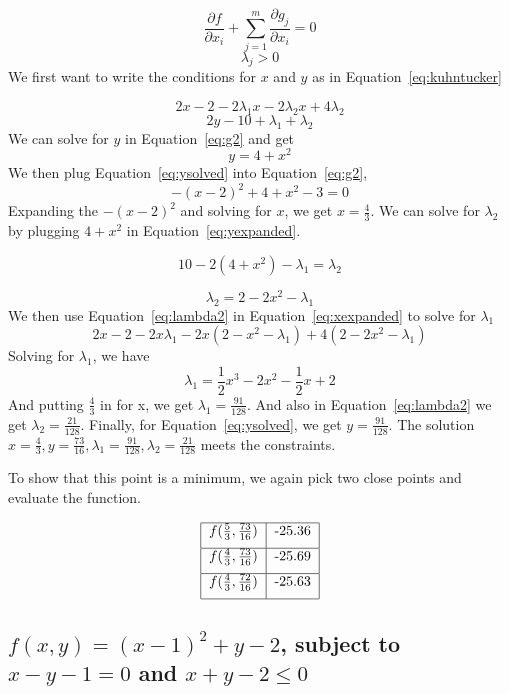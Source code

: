 \documentclass[11pt]{scrartcl}
\begin{document}
\begin{equation}
	\label{eq:kuhntucker}
	\frac{\partial f}{\partial x_i} + \sum_{j=1}^{m}\frac{\partial g_j}{\partial x_i} = 0
\end{equation}
\begin{equation}
	\label{eq:kuhntucker2}
	\lambda_j > 0
\end{equation}
We first want to write the conditions for $x$ and $y$ as in 
Equation~\ref{eq:kuhntucker}

\begin{equation}
	\label{eq:xexpanded}
	2x -2 -2\lambda_1 x - 2\lambda_2 x + 4\lambda_2
\end{equation}
\begin{equation}
	\label{eq:yexpanded}
	2y -10 + \lambda_1 + \lambda_2
\end{equation}
We can solve for $y$ in Equation~\ref{eq:g2}
and get 
\begin{equation}
	\label{eq:ysolved}
	y = 4 + x^2
\end{equation}
We then plug Equation~\ref{eq:ysolved} into Equation~\ref{eq:g2},
\[-(x-2)^2 + 4 + x^2 -3 = 0\]
Expanding the $-(x-2)^2$ and solving for $x$, we get $x=\frac{4}{3}$.
We can solve for $\lambda_2$ by plugging $4+x^2$ in Equation~\ref{eq:yexpanded}.

\[10 - 2(4+x^2) - \lambda_1 = \lambda_2\]

\begin{equation}
	\label{eq:lambda2}
	\lambda_2 = 2 - 2x^2 -\lambda_1
\end{equation}
We then use Equation~\ref{eq:lambda2} in Equation~\ref{eq:xexpanded} to solve
for $\lambda_1$
\[2x - 2 -2x\lambda_1 - 2x(2-x^2-\lambda_1) +4(2-2x^2 -\lambda_1)\]
Solving for $\lambda_1$, we have 
\begin{equation}
	\label{eq:lambda1}
	\lambda_1 = \frac{1}{2}x^3 -2x^2 -\frac{1}{2}x + 2
\end{equation}
And putting $\frac{4}{3}$ in for x, we get $\lambda_1 = \frac{91}{128}$.
And also in Equation~\ref{eq:lambda2} we get $\lambda_2 = \frac{21}{128}$.
Finally, for Equation~\ref{eq:ysolved}, we get $y=\frac{91}{128}$.
The solution $x=\frac{4}{3}, y=\frac{73}{16}, \lambda_1 = \frac{91}{128},
\lambda_2 = \frac{21}{128}$ meets the constraints.

To show that this point is a minimum, we again pick two close points and
evaluate the function.

\[
\begin{tabular}{|c|c|}
	\hline 
	$f(\frac{5}{3}, \frac{73}{16})$ & -25.36 \\ [.2cm]
	\hline 
	$f(\frac{4}{3}, \frac{73}{16})$ & -25.69 \\ [.2cm]
	\hline 
	$f(\frac{4}{3}, \frac{72}{16})$ & -25.63 \\ [.2cm]
	\hline
\end{tabular}
\]

\subsection{$f(x,y) = (x-1)^2 + y -2$, subject to $x - y -1 =0$ and 
$x+y-2 \leq 0$}
\end{document}
